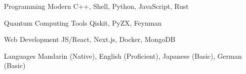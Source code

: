 

\begin{cvskills}

  \cvskill
    {Programming} %
    {Modern C++, Shell, Python, JavaScript, Rust} %
    
  \cvskill
    {Quantum Computing Tools} %
    {Qiskit, PyZX, Feynman} %
    

  \cvskill
    {Web Development} %
    {JS/React, Next.js, Docker, MongoDB} %

  \cvskill
    {Languages} %
    {Mandarin (Native), English (Proficient), Japanese (Basic), German (Basic)} %

\end{cvskills}
